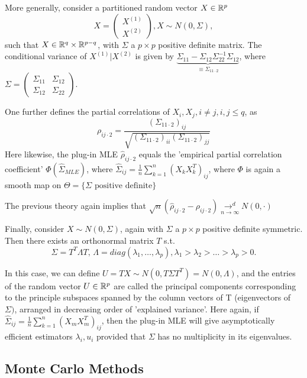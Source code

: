 \documentclass[a4paper]{article}
\begin{document}
More generally, consider a partitioned random vector $X \in \mathbb{R}^{p}$ 
\[
	X = \begin{pmatrix} X^{(1)} \\ X^{(2)} \end{pmatrix}, X\sim N(0, \Sigma)
	,\] such that $X \in \mathbb{R}^{q} \times \mathbb{R} ^{p-q}$, with $\Sigma$ a $p\times p$ positive definite matrix. The conditional variance of $X^{(1)} | X^{(2)}$ is given by $\underbrace{\Sigma_{11} - \Sigma_{12}\Sigma_{22}^{-1}\Sigma_{12}}_{\equiv \Sigma_{11\cdot 2}}$, where $\Sigma = \begin{pmatrix} \Sigma_{11} & \Sigma_{12} \\ \Sigma_{12} & \Sigma_{22} \end{pmatrix} $.

One further defines the partial correlations of $X_i, X_j, i\neq j, i,j \le q$, as
\[
	\rho_{ij\cdot 2} = \frac{\left(\Sigma_{11\cdot 2}\right)_{ij}}{\sqrt{\left(\Sigma_{11\cdot 2}\right)_{ii} \left( \Sigma_{11\cdot 2} \right)_{jj} } }
\] 
Here likewise, the plug-in MLE $\hat{\rho}_{ij\cdot 2}$ equals the 'empirical partial correlation coefficient' $\Phi(\hat{\Sigma}_{MLE})$, where $\hat{\Sigma}_{ij} = \frac{1}{n}\sum_{k=1}^{n} (X_k X_k^{T})_{ij}$, where $\Phi$ is again a smooth map on $\Theta = \{\Sigma \text{ positive definite}\} $

The previous theory again implies that $\sqrt{n}(\hat{\rho}_{ij\cdot 2} - \rho_{ij\cdot 2}) \underset{n\to \infty}{\to ^{d}} N(0,\cdot )$

Finally, consider $X \sim N(0, \Sigma)$, again with $\Sigma$ a $p\times p$ positive definite symmetric. Then there exists an orthonormal matrix $T$ s.t.
\[
	\Sigma = T^{T}\Lambda T \text{, } \Lambda = diag(\lambda_1, \ldots, \lambda_p), \lambda_1 >  \lambda_2 > \ldots > \lambda_p > 0.
\] 

In this case, we can define $U = TX \sim N(0, T\Sigma T^{T}) = N(0, \Lambda)$, and the entries of the random vector $U\in \mathbb{R}^{p}$ are called the principal components corresponding to the principle subspaces spanned by the column vectors of T (eigenvectors of  $\Sigma)$, arranged in decreasing order of 'explained variance'. Here again, if $\hat{\Sigma}_{ij} = \frac{1}{n} \sum_{k=1}^{n}(X_m X_m^{T})_{ij} $, then the plug-in MLE will give asymptotically efficient estimators $ \lambda_i, u_i$ provided that $\Sigma$ has no multiplicity in its eigenvalues. 

\subsection{Monte Carlo Methods}
\end{document}

